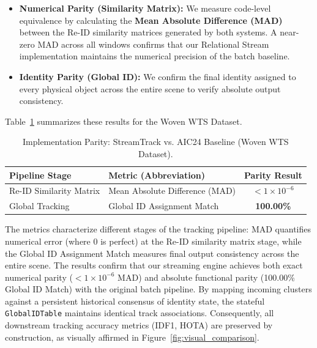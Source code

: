 \documentclass[11pt]{article}
\begin{document}
\begin{itemize}[leftmargin=*]
    \item \textbf{Numerical Parity (Similarity Matrix):} We measure code-level equivalence by calculating the \textbf{Mean Absolute Difference (MAD)} between the Re-ID similarity matrices generated by both systems. A near-zero MAD across all windows confirms that our Relational Stream implementation maintains the numerical precision of the batch baseline.
    \item \textbf{Identity Parity (Global ID):} We confirm the final identity assigned to every physical object across the entire scene to verify absolute output consistency.
\end{itemize}

Table~\ref{tab:parity_metrics} summarizes these results for the Woven WTS Dataset.

\begin{table}[H]
    \centering
    \caption{Implementation Parity: StreamTrack vs. AIC24 Baseline (Woven WTS Dataset).}
    \label{tab:parity_metrics}
    \begin{tabular}{@{}llc@{}}
        \toprule
        \textbf{Pipeline Stage} & \textbf{Metric (Abbreviation)} & \textbf{Parity Result} \\ \midrule
        Re-ID Similarity Matrix & Mean Absolute Difference (MAD) & $< 1 \times 10^{-6}$ \\ \hline
        Global Tracking & Global ID Assignment Match & \textbf{100.00\%} \\ \bottomrule
    \end{tabular}
\end{table}

The metrics characterize different stages of the tracking pipeline: MAD quantifies numerical error (where $0$ is perfect) at the Re-ID similarity matrix stage, while the Global ID Assignment Match measures final output consistency across the entire scene. The results confirm that our streaming engine achieves both exact numerical parity ($< 1 \times 10^{-6}$ MAD) and absolute functional parity (100.00\% Global ID Match) with the original batch pipeline. By mapping incoming clusters against a persistent historical consensus of identity state, the stateful \texttt{GlobalIDTable} maintains identical track associations. Consequently, all downstream tracking accuracy metrics (IDF1, HOTA) are preserved by construction, as visually affirmed in Figure~\ref{fig:visual_comparison}. 
\end{document}
